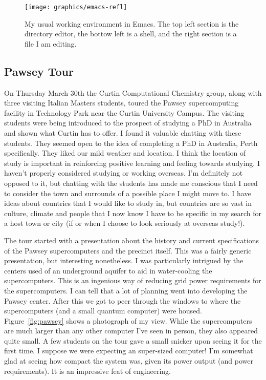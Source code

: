 \documentclass[11pt]{article}
\begin{document}
\begin{figure}[h!]
  \centering
  \texttt{[image: graphics/emacs-refl]}
  \caption{My usual working environment in Emacs. The top left section is the directory editor, the bottow left is a shell, and the right section is a file I am editing.}
  \label{fig:emacs-refl}
\end{figure}

\subsection{Pawsey Tour}

On Thursday March 30th the Curtin Computational Chemistry group, along with three visiting Italian Masters students, toured the Pawsey supercomputing facility in Technology Park near the Curtin University Campus. The visiting students were being introduced to the prospect of studying a PhD in Australia and shown what Curtin has to offer. I found it valuable chatting with these students. They seemed open to the idea of completing a PhD in Australia, Perth specifically. They liked our mild weather and location. I think the location of study is important in reinforcing positive learning and feeling towards studying. I haven't properly considered studying or working overseas. I'm definitely not opposed to it, but chatting with the students has made me conscious that I need to consider the town and surrounds of a possible place I might move to. I have ideas about countries that I would like to study in, but countries are so vast in culture, climate and people that I now know I have to be specific in my search for a host town or city (if or when I choose to look seriously at overseas study!).

The tour started with a presentation about the history and current specifications of the Pawsey supercomputers and the precinct itself. This was a fairly generic presentation, but interesting nonetheless. I was particularly intrigued by the centers used of an underground aquifer to aid in water-cooling the supercomputers. This is an ingenious way of reducing grid power requirements for the supercomputers. I can tell that a lot of planning went into developing the Pawsey center. After this we got to peer through the windows to where the supercomputers (and a small quantum computer) were housed. Figure~\ref{fig:pawsey} shows a photograph of my view. While the supercomputers are much larger than any other computer I've seen in person, they also appeared quite small. A few students on the tour gave a small snicker upon seeing it for the first time. I suppose we were expecting an super-sized computer! I'm somewhat glad at seeing how compact the system was, given its power output (and power requirements). It is an impressive feat of engineering.
\end{document}
